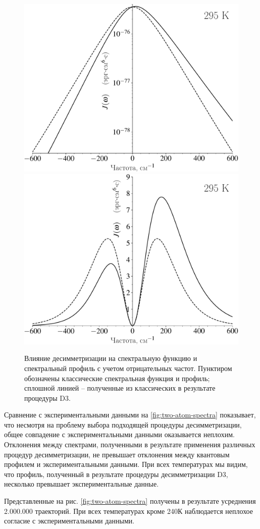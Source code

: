 \begin{figure}[H]
    \centering
    \includegraphics[width=0.49\linewidth]{./pictures/two_atom_spectra/spectral_function_d3-crop.pdf}
    \includegraphics[width=0.49\linewidth]{./pictures/two_atom_spectra/spectrum_effect_d3-crop.pdf}
    \caption{Влияние десимметризации на спектральную функцию и спектральный профиль с учетом отрицательных частот. Пунктиром обозначены классические спектральная функция и профиль; сплошной линией -- полученные из классических в результате процедуры D3.}
\end{figure}

Сравнение с экспериментальными данными на \ref{fig:two-atom-spectra} показывает, что несмотря на проблему выбора подходящей процедуры десимметризации, общее совпадение с экспериментальными данными оказывается неплохим. Отклонения между спектрами, полученными в результате применения различных процедур десимметризации, не превышает отклонения между квантовым профилем и экспериментальными данными. При всех температурах мы видим, что профиль, полученный в результате процедуры десимметризации D3, несколько превышает экспериментальные данные. \par 
Представленные на рис. \ref{fig:two-atom-spectra} получены в результате усреднения 2.000.000 траекторий. При всех температурах кроме 240К наблюдается неплохое согласие с экспериментальными данными.  


